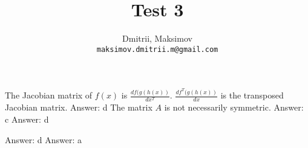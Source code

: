 \documentclass{homework}
\title{Test 3}
\author{
  Dmitrii, Maksimov\\
  \texttt{maksimov.dmitrii.m@gmail.com}
}
\begin{document}
\maketitle

\exercise
The Jacobian matrix of $f(x)$ is $\frac{df(g(h(x))}{dx^T}$. $\frac{df^T(g(h(x))}{dx}$ is the transposed Jacobian matrix.\newline
Answer: d
\exercise*
The matrix $A$ is not necessarily symmetric. \newline
Answer: c
\exercise*
Answer: d
\exercise*
{}
Answer: d
\exercise*
Answer: a
\end{document}
